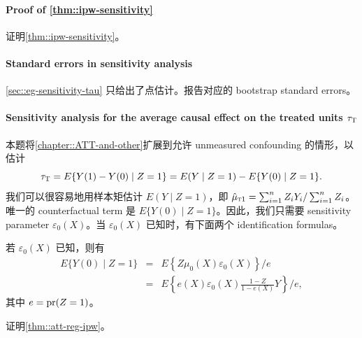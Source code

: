 \paragraph{Proof of \cref{thm::ipw-sensitivity}}\label{hw::proof-theorem-2-sa}

证明\cref{thm::ipw-sensitivity}。


\paragraph{Standard errors in sensitivity analysis}\label{hw::sensitivity-se}

\cref{sec::eg-sensitivity-tau} 只给出了点估计。报告对应的 bootstrap standard errors。

  


\paragraph{Sensitivity analysis for the average causal effect on the treated units $\tau_\textsc{T}$}\label{hw::att-sentivity-analysis}

本题将\cref{chapter::ATT-and-other}扩展到允许 unmeasured confounding 的情形，以估计
$$
\tau_\textsc{T} = E\{  Y(1) - Y(0)  \mid Z=1  \} 
= E(Y\mid Z=1) - E\{  Y(0)  \mid Z=1  \} .
$$
我们可以很容易地用样本矩估计 $E(Y\mid Z=1)$，即 $\hat{\mu}_{\textsc{t}1} =   \sum_{i=1}^n Z_i Y_i / \sum_{i=1}^n Z_i$。唯一的 counterfactual term 是 $E\{  Y(0)  \mid Z=1  \}$。因此，我们只需要 sensitivity parameter $ \varepsilon_0(X) $。当 $\varepsilon_0(X)$ 已知时，有下面两个 identification formulas。

\begin{theorem}
\label{thm::att-reg-ipw}
若 $\varepsilon_0(X) $ 已知，则有
 \begin{eqnarray*}
E\{  Y(0)  \mid Z=1  \}  &=& E\left\{  Z \mu_0(X)  \varepsilon_0(X)    \right\} /e \\
&=& E\left\{  e(X)\varepsilon_0(X) \frac{ 1-Z}{1-e(X)}  Y      \right\} /e,
\end{eqnarray*}
其中 $e = \textup{pr}(Z=1)$。
\end{theorem}


证明\cref{thm::att-reg-ipw}。

